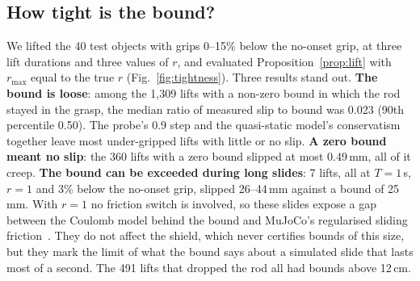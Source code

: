 \subsection{How tight is the bound?}\label{sec:tight}
We lifted the 40 test objects with grips 0--15\% below the no-onset grip, at three lift durations and three values of $r$,
and evaluated Proposition~\ref{prop:lift} with $r_{\max}$ equal to the true $r$ (Fig.~\ref{fig:tightness}). Three results
stand out. \textbf{The bound is loose}: among the 1{,}309 lifts with a non-zero bound in which the rod stayed in the grasp,
the median ratio of measured slip to bound was 0.023 (90th percentile 0.50). The probe's 0.9 step and the quasi-static
model's conservatism together leave most under-gripped lifts with little or no slip. \textbf{A zero bound meant no slip}:
the 360 lifts with a zero bound slipped at most 0.49\,mm, all of it creep. \textbf{The bound can be exceeded during long
slides}: 7 lifts, all at $T=1$\,s, $r=1$ and 3\% below the no-onset grip, slipped 26--44\,mm against a bound of 25\,mm. With
$r=1$ no friction switch is involved, so these slides expose a gap between the Coulomb model behind the bound and MuJoCo's
regularised sliding friction~\cite{todorov2012}. They do not affect the shield, which never certifies bounds of this size,
but they mark the limit of what the bound says about a simulated slide that lasts most of a second. The 491 lifts that
dropped the rod all had bounds above 12\,cm.

